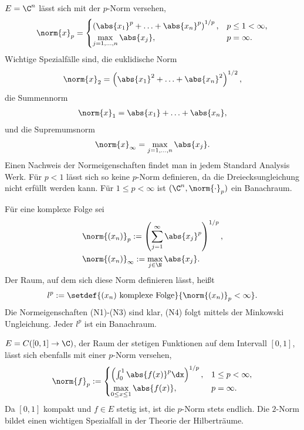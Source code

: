 \begin{bsp}
\label{bsp:1.5}
\begin{bspenum}
  \item $E=\C^n$ lässt sich mit der $p$-Norm versehen,
\begin{align*}
\norm{x}_p = \begin{cases}
              \left(\abs{x_1}^p + \ldots +
\abs{x_n}^p\right)^{1/p}, & p\le 1 < \infty,\\
\max\limits_{j=1,\ldots,n} \abs{x_j},& p = \infty.
             \end{cases}
\end{align*}
Wichtige Spezialfälle sind, die euklidische Norm
\begin{align*}
\norm{x}_2 = \left(\abs{x_1}^2 + \ldots + \abs{x_n}^2\right)^{1/2},
\end{align*}
die Summennorm
\begin{align*}
\norm{x}_1 = \abs{x_1} + \ldots + \abs{x_n},
\end{align*}
und die Supremumsnorm
\begin{align*}
\norm{x}_\infty = \max\limits_{j=1,\ldots,n} \abs{x_j}.
\end{align*}
Einen Nachweis der Normeigenschaften findet man in jedem Standard Analysis
Werk. Für $p<1$ lässt sich so keine $p$-Norm definieren, da die
Dreiecksungleichung nicht erfüllt werden kann. Für $1\le p<\infty$ ist
$(\C^n,\norm{\cdot}_p)$ ein Banachraum.
\item Für eine komplexe Folge sei
\begin{align*}
&\norm{(x_n)}_p := \left(\sum\limits_{j=1}^\infty \abs{x_j}^p \right)^{1/p},\\
&\norm{(x_n)}_\infty := \max\limits_{j\in\N}\abs{x_j}.
\end{align*}
Der Raum, auf dem sich diese Norm definieren lässt, heißt
\begin{align*}
l^p := \setdef{(x_n)\text{ komplexe Folge}}{\norm{(x_n)}_p < \infty}.
\end{align*}
Die Normeigenschaften (N1)-(N3) sind klar, (N4) folgt mittels der Minkowski
Ungleichung. Jeder $l^p$ ist ein Banachraum.
\item $E=C([0,1]\to\C)$, der Raum der stetigen Funktionen auf dem Intervall
$[0,1]$, lässt sich ebenfalls mit einer $p$-Norm versehen,
\begin{align*}
\norm{f}_p :=
\begin{cases}
 \left(\int_0^1 \abs{f(x)}^p \dx\right)^{1/p},& 1\le p <\infty,\\
 \max\limits_{0\le x\le 1} \abs{f(x)}, & p = \infty.
\end{cases}
\end{align*}
Da $[0,1]$ kompakt und $f\in E$ stetig ist, ist die $p$-Norm stets endlich.
Die $2$-Norm bildet einen wichtigen Spezialfall in der Theorie der Hilberträume.


\end{bspenum}
\end{bsp}
